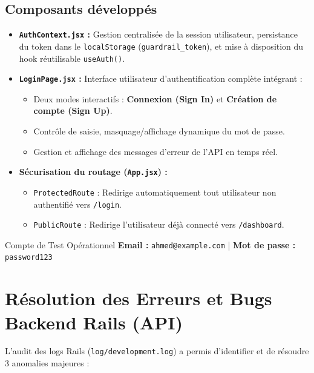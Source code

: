 \documentclass[11pt,a4paper]{article}
\begin{document}
\subsection{Composants développés}
\begin{itemize}[leftmargin=*]
    \item \textbf{\texttt{AuthContext.jsx} :} Gestion centralisée de la session utilisateur, persistance du token dans le \texttt{localStorage} (\texttt{guardrail\_token}), et mise à disposition du hook réutilisable \texttt{useAuth()}.
    \item \textbf{\texttt{LoginPage.jsx} :} Interface utilisateur d'authentification complète intégrant :
    \begin{itemize}
        \item Deux modes interactifs : \textbf{Connexion (Sign In)} et \textbf{Création de compte (Sign Up)}.
        \item Contrôle de saisie, masquage/affichage dynamique du mot de passe.
        \item Gestion et affichage des messages d'erreur de l'API en temps réel.
    \end{itemize}
    \item \textbf{Sécurisation du routage (\texttt{App.jsx}) :}
    \begin{itemize}
        \item \texttt{ProtectedRoute} : Redirige automatiquement tout utilisateur non authentifié vers \texttt{/login}.
        \item \texttt{PublicRoute} : Redirige l'utilisateur déjà connecté vers \texttt{/dashboard}.
    \end{itemize}
\end{itemize}

\begin{successBox}{Compte de Test Opérationnel}
    \textbf{Email :} \texttt{ahmed@example.com} \quad | \quad \textbf{Mot de passe :} \texttt{password123}
\end{successBox}

\section{Résolution des Erreurs et Bugs Backend Rails (API)}
\label{sec:backend}

L'audit des logs Rails (\texttt{log/development.log}) a permis d'identifier et de résoudre 3 anomalies majeures :
\end{document}
